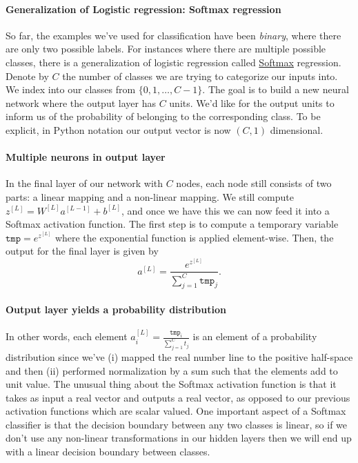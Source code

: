 \documentclass[12pt]{article}
\begin{document}
\paragraph{Generalization of Logistic regression: Softmax regression}
So far, the examples we've used for classification have been 
\emph{binary}, where there are only two possible labels. For instances where there are multiple possible classes,
there is a generalization of logistic regression called \href{https://en.wikipedia.org/wiki/Softmax_function}{Softmax} regression. Denote by $C$ the number of classes we are trying to categorize our inputs into. We index into our classes from $\{0, 1, \ldots, C-1\}$. The goal is to build a new neural network where the output layer has $C$ units. We'd like for the output units to inform us of the probability of belonging to the corresponding class. To be explicit, in Python notation our output vector is now $(C, 1)$ dimensional.

\paragraph{Multiple neurons in output layer}
In the final layer of our network with $C$ nodes, each node still consists of two parts: a linear mapping and a non-linear mapping. We still compute $z^{[L]} = W^{[L]} a^{[L-1]} + b^{[L]}$, and once we have this we can now feed it into a Softmax activation function. The first step is to compute a temporary variable $\texttt{tmp} = e^{z^{[L]}}$ where the exponential function is applied element-wise. Then, the output for the final layer is given by
\[
a^{[L]} = \frac{e^{z^{[L]}}}{\sum_{j=1}^C \texttt{tmp}_j}.
\]
\paragraph{Output layer yields a probability distribution}
In other words, each element $a_i^{[L]} = \frac{\texttt{tmp}_i}{\sum_{j=1}^C t_j}$ is an element of a probability 
distribution since we've (i) mapped the real number line to the positive half-space and then (ii) 
performed normalization by a sum such that the elements add to unit value. The unusual thing about the 
Softmax activation function is that it takes as input a real vector and outputs a real vector, as opposed to our 
previous activation functions which are scalar valued. One important aspect of a Softmax classifier is 
that the decision boundary between any two classes is linear, 
so if we don't use any non-linear transformations in our hidden layers then we will end up with a linear decision boundary between classes.
\end{document}
